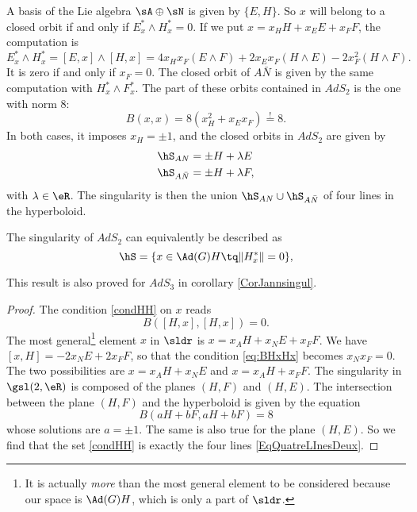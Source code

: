A basis of the Lie algebra $\sA\oplus\sN$ is given by $\{E,H\}$. So $x$ will belong to a closed orbit if and only if $E_x^*\wedge H^*_x=0$. If we put $x=x_HH+x_EE+x_FF$, the computation is
\[
E_x^*\wedge H^*_x=[E,x]\wedge[H,x]
                 =4x_Hx_F (E\wedge F)+2x_Ex_F (H\wedge E)-2x_F^2 (H\wedge F).
\]
It is zero if and only if $x_F=0$. The closed orbit of $A\bar{N}$ is given by the same computation with $H^*_x\wedge F^*_x$. The part of these orbits contained in $AdS_2$ is the one with norm $8$:
\[
B(x,x)=8(x_H^2+x_Ex_F)\stackrel{!}{=}8.
\]
In both cases, it imposes $x_H=\pm 1$, and the closed orbits in $AdS_2$ are given by
\begin{subequations}\label{EqQuatreLInesDeux}
\begin{align}		
\hS_{AN}&=\pm H+\lambda E\\
\hS_{A\bar N}&=\pm H+\lambda F,
\end{align}
\end{subequations}
with $\lambda\in\eR$. The singularity is then the union $\hS_{AN}\cup\hS_{A\bar N}$ of four lines in the hyperboloid.

\begin{proposition} \label{PropAdSDeuxJannule}
     The singularity of $AdS_2$ can equivalently be described as
    \begin{equation}\label{condHH}
        \hS=\{x \in \Ad(G)H \tq \|H^*_x\|=0\},
    \end{equation}
\end{proposition}
This result is also proved for \( AdS_3\) in corollary \ref{CorJannsingul}.

\begin{proof}
The condition \eqref{condHH} on $x$ reads
\begin{equation}\label{eq:BHxHx}
B([H,x],[H,x])=0.
\end{equation}
The most general\footnote{It is actually \emph{more} than the most general element to be considered because our space is $\Ad(G)H$, which is only a part of $\sldr$.} element $x$ in $\sldr$ is $x=x_AH+x_NE+x_FF$. We have $[x,H]=-2x_NE+2x_FF$, so that the condition \eqref{eq:BHxHx} becomes $x_Nx_F=0$. The two possibilities are $x=x_AH+x_NE$ and $x=x_AH+x_FF$. The singularity in $\gsl(2,\eR)$ is composed of the planes $(H,F)$ and $(H,E)$. The intersection between the plane $(H,F)$ and the hyperboloid is given by the equation
\[
B(aH+bF,aH+bF)=8
\]
whose solutions are $a=\pm 1$. The same is also true for the plane $(H,E)$. So we find that the set \eqref{condHH} is exactly the four lines  \eqref{EqQuatreLInesDeux}.

\end{proof}


